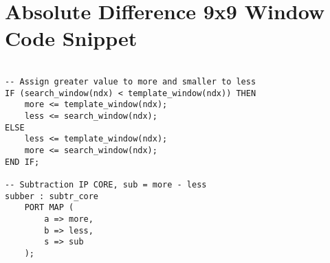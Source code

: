 \chapter{Absolute Difference 9x9 Window Code Snippet}
\label{sec:appdxA}



\begin{lstlisting}

-- Assign greater value to more and smaller to less
IF (search_window(ndx) < template_window(ndx)) THEN 
	more <= template_window(ndx);
	less <= search_window(ndx);
ELSE
	less <= template_window(ndx);
	more <= search_window(ndx);
END IF;

-- Subtraction IP CORE, sub = more - less
subber : subtr_core
	PORT MAP (
		a => more,
		b => less,
		s => sub
	);
	
\end{lstlisting}
